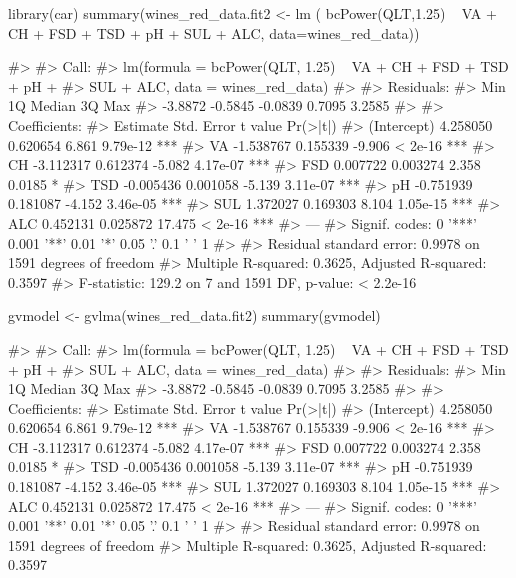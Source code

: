 \begin{Schunk}
\begin{Sinput}
library(car)
summary(wines_red_data.fit2 <- lm (
  bcPower(QLT,1.25)  ~ VA + CH + FSD + TSD + pH + SUL + ALC,
  data=wines_red_data))
\end{Sinput}
\begin{Soutput}
#> 
#> Call:
#> lm(formula = bcPower(QLT, 1.25) ~ VA + CH + FSD + TSD + pH + 
#>     SUL + ALC, data = wines_red_data)
#> 
#> Residuals:
#>     Min      1Q  Median      3Q     Max 
#> -3.8872 -0.5845 -0.0839  0.7095  3.2585 
#> 
#> Coefficients:
#>              Estimate Std. Error t value Pr(>|t|)    
#> (Intercept)  4.258050   0.620654   6.861 9.79e-12 ***
#> VA          -1.538767   0.155339  -9.906  < 2e-16 ***
#> CH          -3.112317   0.612374  -5.082 4.17e-07 ***
#> FSD          0.007722   0.003274   2.358   0.0185 *  
#> TSD         -0.005436   0.001058  -5.139 3.11e-07 ***
#> pH          -0.751939   0.181087  -4.152 3.46e-05 ***
#> SUL          1.372027   0.169303   8.104 1.05e-15 ***
#> ALC          0.452131   0.025872  17.475  < 2e-16 ***
#> ---
#> Signif. codes:  0 '***' 0.001 '**' 0.01 '*' 0.05 '.' 0.1 ' ' 1
#> 
#> Residual standard error: 0.9978 on 1591 degrees of freedom
#> Multiple R-squared:  0.3625, Adjusted R-squared:  0.3597 
#> F-statistic: 129.2 on 7 and 1591 DF,  p-value: < 2.2e-16
\end{Soutput}
\begin{Sinput}
gvmodel <- gvlma(wines_red_data.fit2) 
summary(gvmodel)
\end{Sinput}
\begin{Soutput}
#> 
#> Call:
#> lm(formula = bcPower(QLT, 1.25) ~ VA + CH + FSD + TSD + pH + 
#>     SUL + ALC, data = wines_red_data)
#> 
#> Residuals:
#>     Min      1Q  Median      3Q     Max 
#> -3.8872 -0.5845 -0.0839  0.7095  3.2585 
#> 
#> Coefficients:
#>              Estimate Std. Error t value Pr(>|t|)    
#> (Intercept)  4.258050   0.620654   6.861 9.79e-12 ***
#> VA          -1.538767   0.155339  -9.906  < 2e-16 ***
#> CH          -3.112317   0.612374  -5.082 4.17e-07 ***
#> FSD          0.007722   0.003274   2.358   0.0185 *  
#> TSD         -0.005436   0.001058  -5.139 3.11e-07 ***
#> pH          -0.751939   0.181087  -4.152 3.46e-05 ***
#> SUL          1.372027   0.169303   8.104 1.05e-15 ***
#> ALC          0.452131   0.025872  17.475  < 2e-16 ***
#> ---
#> Signif. codes:  0 '***' 0.001 '**' 0.01 '*' 0.05 '.' 0.1 ' ' 1
#> 
#> Residual standard error: 0.9978 on 1591 degrees of freedom
#> Multiple R-squared:  0.3625, Adjusted R-squared:  0.3597 

\end{Soutput}
\end{Schunk}
